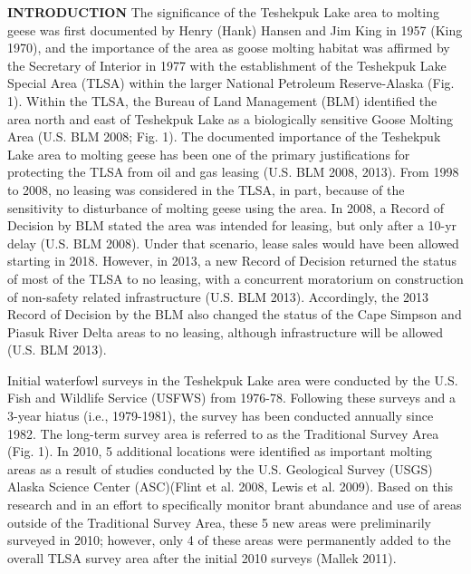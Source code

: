 \documentclass[]{article}
\begin{document}
\textbf{INTRODUCTION}\break
The significance of the Teshekpuk Lake area to molting geese was first
documented by Henry (Hank) Hansen and Jim King in 1957 (King 1970), and
the importance of the area as goose molting habitat was affirmed by the
Secretary of Interior in 1977 with the establishment of the Teshekpuk
Lake Special Area (TLSA) within the larger National Petroleum
Reserve-Alaska (Fig. 1). Within the TLSA, the Bureau of Land Management
(BLM) identified the area north and east of Teshekpuk Lake as a
biologically sensitive Goose Molting Area (U.S. BLM 2008; Fig. 1). The
documented importance of the Teshekpuk Lake area to molting geese has
been one of the primary justifications for protecting the TLSA from oil
and gas leasing (U.S. BLM 2008, 2013). From 1998 to 2008, no leasing was
considered in the TLSA, in part, because of the sensitivity to
disturbance of molting geese using the area. In 2008, a Record of
Decision by BLM stated the area was intended for leasing, but only after
a 10-yr delay (U.S. BLM 2008). Under that scenario, lease sales would
have been allowed starting in 2018. However, in 2013, a new Record of
Decision returned the status of most of the TLSA to no leasing, with a
concurrent moratorium on construction of non-safety related
infrastructure (U.S. BLM 2013). Accordingly, the 2013 Record of Decision
by the BLM also changed the status of the Cape Simpson and Piasuk River
Delta areas to no leasing, although infrastructure will be allowed (U.S.
BLM 2013).

Initial waterfowl surveys in the Teshekpuk Lake area were conducted by
the U.S. Fish and Wildlife Service (USFWS) from 1976-78. Following these
surveys and a 3-year hiatus (i.e., 1979-1981), the survey has been
conducted annually since 1982. The long-term survey area is referred to
as the Traditional Survey Area (Fig. 1). In 2010, 5 additional locations
were identified as important molting areas as a result of studies
conducted by the U.S. Geological Survey (USGS) Alaska Science Center
(ASC)(Flint et al. 2008, Lewis et al. 2009). Based on this research and
in an effort to specifically monitor brant abundance and use of areas
outside of the Traditional Survey Area, these 5 new areas were
preliminarily surveyed in 2010; however, only 4 of these areas were
permanently added to the overall TLSA survey area after the initial 2010
surveys (Mallek 2011).
\end{document}

